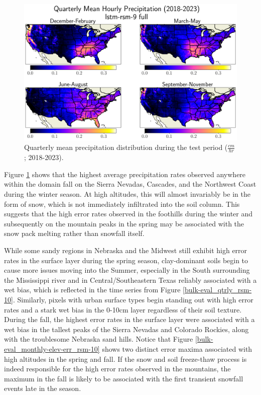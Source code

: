 \begin{figure}[h!]
    \centering

    \includegraphics[width=.99\linewidth,draft=false]{figures/grid-eval_qtrly/eval-grid_full_lstm-rsm-9_pixelwise-time-stats_abs-err_qtrly-horizon-apcp.png}

    \caption{Quarterly mean precipitation distribution during the test period ($\frac{cm}{hr}$; 2018-2023).}
    \label{bulk-eval_qtrly-precip}
\end{figure}

Figure \ref{bulk-eval_qtrly-precip} shows that the highest average precipitation rates observed anywhere within the domain fall on the Sierra Nevadas, Cascades, and the Northwest Coast during the winter season. At high altitudes, this will almost invariably be in the form of snow, which is not immediately infiltrated into the soil column. This suggests that the high error rates observed in the foothills during the winter and subsequently on the mountain peaks in the spring may be associated with the snow pack melting rather than snowfall itself.

While some sandy regions in Nebraska and the Midwest still exhibit high error rates in the surface layer during the spring season, clay-dominant soils begin to cause more issues moving into the Summer, especially in the South surrounding the Mississippi river and in Central/Southeastern Texas reliably associated with a wet bias, which is reflected in the time series from Figure \ref{bulk-eval_qtrly_rsm-10}. Similarly, pixels with urban surface types begin standing out with high error rates and a stark wet bias in the 0-10cm layer regardless of their soil texture. During the fall, the highest error rates in the surface layer were associated with a wet bias in the tallest peaks of the Sierra Nevadas and Colorado Rockies, along with the troublesome Nebraska sand hills. Notice that Figure \ref{bulk-eval_monthly-elev-err_rsm-10} shows two distinct error maxima associated with high altitudes in the spring and fall. If the snow and soil freeze-thaw process is indeed responsible for the high error rates observed in the mountains, the maximum in the fall is likely to be associated with the first transient snowfall events late in the season.


